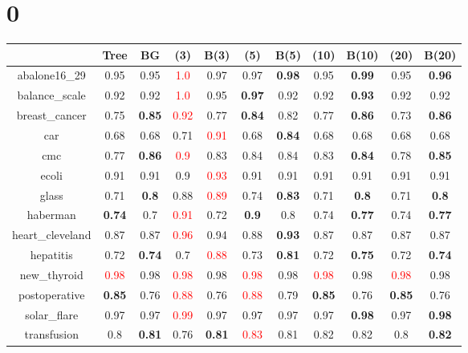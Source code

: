 \documentclass{article}%
\begin{document}
%
\normalsize%
\section*{0}%
\begin{tabular}{c|cccccccccc}%
\hline%
&Tree&BG&(3)&B(3)&(5)&B(5)&(10)&B(10)&(20)&B(20)\\%
\hline%
abalone16\_29&0.95&0.95&\textcolor{red}{ 
1.0
}&0.97&0.97&\textbf{0.98}&0.95&\textbf{0.99}&0.95&\textbf{0.96}\\%
\hline%
balance\_scale&0.92&0.92&\textcolor{red}{ 
1.0
}&0.95&\textbf{0.97}&0.92&0.92&\textbf{0.93}&0.92&0.92\\%
\hline%
breast\_cancer&0.75&\textbf{0.85}&\textcolor{red}{ 
0.92
}&0.77&\textbf{0.84}&0.82&0.77&\textbf{0.86}&0.73&\textbf{0.86}\\%
\hline%
car&0.68&0.68&0.71&\textcolor{red}{ 
0.91
}&0.68&\textbf{0.84}&0.68&0.68&0.68&0.68\\%
\hline%
cmc&0.77&\textbf{0.86}&\textcolor{red}{ 
0.9
}&0.83&0.84&0.84&0.83&\textbf{0.84}&0.78&\textbf{0.85}\\%
\hline%
ecoli&0.91&0.91&0.9&\textcolor{red}{ 
0.93
}&0.91&0.91&0.91&0.91&0.91&0.91\\%
\hline%
glass&0.71&\textbf{0.8}&0.88&\textcolor{red}{ 
0.89
}&0.74&\textbf{0.83}&0.71&\textbf{0.8}&0.71&\textbf{0.8}\\%
\hline%
haberman&\textbf{0.74}&0.7&\textcolor{red}{ 
0.91
}&0.72&\textbf{0.9}&0.8&0.74&\textbf{0.77}&0.74&\textbf{0.77}\\%
\hline%
heart\_cleveland&0.87&0.87&\textcolor{red}{ 
0.96
}&0.94&0.88&\textbf{0.93}&0.87&0.87&0.87&0.87\\%
\hline%
hepatitis&0.72&\textbf{0.74}&0.7&\textcolor{red}{ 
0.88
}&0.73&\textbf{0.81}&0.72&\textbf{0.75}&0.72&\textbf{0.74}\\%
\hline%
new\_thyroid&\textcolor{red}{ 
0.98
}&0.98&\textcolor{red}{ 
0.98
}&0.98&\textcolor{red}{ 
0.98
}&0.98&\textcolor{red}{ 
0.98
}&0.98&\textcolor{red}{ 
0.98
}&0.98\\%
\hline%
postoperative&\textbf{0.85}&0.76&\textcolor{red}{ 
0.88
}&0.76&\textcolor{red}{ 
0.88
}&0.79&\textbf{0.85}&0.76&\textbf{0.85}&0.76\\%
\hline%
solar\_flare&0.97&0.97&\textcolor{red}{ 
0.99
}&0.97&0.97&0.97&0.97&\textbf{0.98}&0.97&\textbf{0.98}\\%
\hline%
transfusion&0.8&\textbf{0.81}&0.76&\textbf{0.81}&\textcolor{red}{ 
0.83
}&0.81&0.82&0.82&0.8&\textbf{0.82}\\%
\hline%

\end{tabular}
\end{document}
